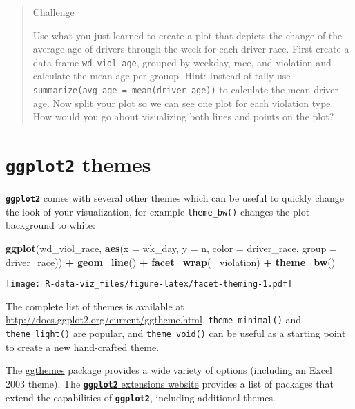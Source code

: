\documentclass[]{book}
\newenvironment{Shaded}{\begin{snugshade}}{\end{snugshade}}
\newcommand{\KeywordTok}[1]{\textcolor[rgb]{0.13,0.29,0.53}{\textbf{#1}}}
\newcommand{\DataTypeTok}[1]{\textcolor[rgb]{0.13,0.29,0.53}{#1}}
\newcommand{\StringTok}[1]{\textcolor[rgb]{0.31,0.60,0.02}{#1}}
\newcommand{\OperatorTok}[1]{\textcolor[rgb]{0.81,0.36,0.00}{\textbf{#1}}}
\newcommand{\NormalTok}[1]{#1}
\theoremstyle{definition}
\theoremstyle{definition}
\theoremstyle{definition}
\theoremstyle{remark}
\begin{document}
\begin{quote}
Challenge

Use what you just learned to create a plot that depicts the change of
the average age of drivers through the week for each driver race. First
create a data frame \texttt{wd\_viol\_age}, grouped by weekday, race,
and violation and calculate the mean age per grouop. Hint: Instead of
tally use \texttt{summarize(avg\_age\ =\ mean(driver\_age))} to
calculate the mean driver age. Now split your plot so we can see one
plot for each violation type. How would you go about visualizing both
lines and points on the plot?
\end{quote}

\section{\texorpdfstring{\textbf{\texttt{ggplot2}}
themes}{ggplot2 themes}}\label{ggplot2-themes}

\textbf{\texttt{ggplot2}} comes with several other themes which can be
useful to quickly change the look of your visualization, for example
\texttt{theme\_bw()} changes the plot background to white:

\begin{Shaded}
\begin{Highlighting}[]
\KeywordTok{ggplot}\NormalTok{(wd_viol_race, }\KeywordTok{aes}\NormalTok{(}\DataTypeTok{x =}\NormalTok{ wk_day, }\DataTypeTok{y =}\NormalTok{ n, }\DataTypeTok{color =}\NormalTok{ driver_race, }\DataTypeTok{group =}\NormalTok{ driver_race)) }\OperatorTok{+}
\StringTok{  }\KeywordTok{geom_line}\NormalTok{() }\OperatorTok{+}\StringTok{ }
\StringTok{  }\KeywordTok{facet_wrap}\NormalTok{(}\OperatorTok{~}\StringTok{ }\NormalTok{violation) }\OperatorTok{+}
\StringTok{  }\KeywordTok{theme_bw}\NormalTok{()}
\end{Highlighting}
\end{Shaded}

\texttt{[image: R-data-viz\_files/figure-latex/facet-theming-1.pdf]}

The complete list of themes is available at
\url{http://docs.ggplot2.org/current/ggtheme.html}.
\texttt{theme\_minimal()} and \texttt{theme\_light()} are popular, and
\texttt{theme\_void()} can be useful as a starting point to create a new
hand-crafted theme.

The
\href{https://cran.r-project.org/web/packages/ggthemes/vignettes/ggthemes.html}{ggthemes}
package provides a wide variety of options (including an Excel 2003
theme). The
\href{http://www.ggplot2-exts.org/gallery/}{\textbf{\texttt{ggplot2}}
extensions website} provides a list of packages that extend the
capabilities of \textbf{\texttt{ggplot2}}, including additional themes.
\end{document}

